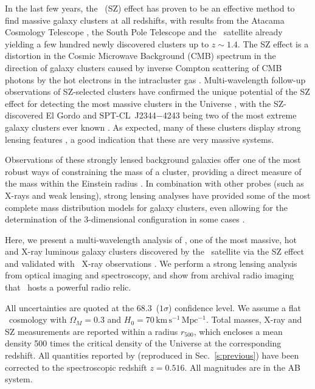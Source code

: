 In the last few years, the \sz\ (SZ) effect has proven to be an effective method to find massive
galaxy clusters at all redshifts, with results from the Atacama Cosmology Telescope \citep[ACT,
e.g.,][]{marriage11_sz,hasselfield13}, the South Pole Telescope \citep[SPT,
e.g.,][]{williamson11,reichardt13} and the \planck\ satellite \citep[e.g.,][]{planck11viii,planck13xxix}
already yielding a few hundred newly discovered clusters up to $z\sim1.4$. The SZ effect is a
distortion in the Cosmic Microwave Background (CMB) spectrum in the direction of galaxy clusters
caused by inverse Compton scattering of CMB photons by the hot electrons in the intracluster gas
\citep{sunyaev72}. Multi-wavelength follow-up observations of SZ-selected clusters have confirmed
the unique potential of the SZ effect for detecting the most massive clusters in the Universe
\citep[e.g.,][]{benson13,sifon13}, with the SZ-discovered El Gordo and SPT-CL~J2344$-$4243 being
two of the most extreme galaxy clusters ever known \citep{menanteau12,mcdonald12}. As 
expected, many of
these clusters display strong lensing features \citep{menanteau10_act}, a good indication that these
are very massive systems.

Observations of these strongly lensed background galaxies offer one of the most robust ways of
constraining the mass of a cluster, providing a direct measure of the mass within the Einstein
radius \citep[see][for a recent review]{kneib11}. In combination with other probes (such as X-rays
and weak lensing), strong lensing analyses have provided some of the most complete mass distribution
models for galaxy clusters, even allowing for the determination of the 3-dimensional configuration
in some cases \citep[e.g.,][]{morandi10, limousin13}.

Here, we present a multi-wavelength analysis of \plck, one of the most massive, hot and X-ray 
luminous galaxy clusters discovered by the \planck\ satellite via the SZ effect and validated with 
\xmm\ X-ray observations \citep{planck11ix}. We perform a strong lensing analysis from 
optical imaging and spectroscopy, and show from archival radio imaging that \plck\ hosts a 
powerful radio relic.

All uncertainties are quoted at the 68.3\percent\ ($1\sigma$) confidence level. We assume a flat \lcdm\
cosmology with $\Omega_M=0.3$ and $H_0=70\,\mathrm{km\,s^{-1}\,Mpc^{-1}}$. Total masses, X-ray and 
SZ measurements are reported within a radius $r_{500}$, which encloses a mean density 500 
times the critical density of the Universe at the corresponding redshift. All quantities reported by
\cite{planck11ix} (reproduced in Sec.\ \ref{s:previous}) have been corrected to the spectroscopic 
redshift $z=0.516$. All magnitudes are in the AB system.


